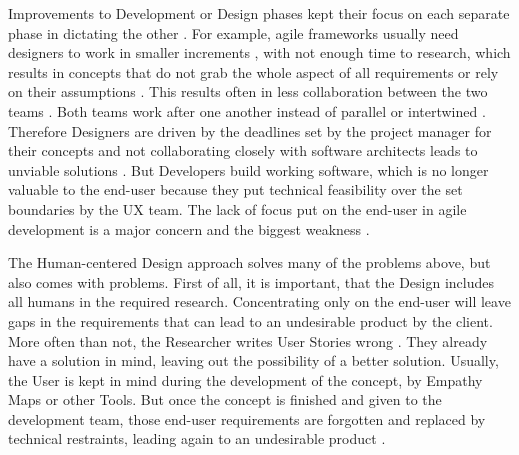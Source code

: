 Improvements to Development or Design phases kept their focus on each separate phase in dictating the other \cite[p. 22]{ratcliffe2011agile}. For example, agile frameworks usually need designers to work in smaller increments \citep{Theartof49:online}, with not enough time to research, which results in concepts that do not grab the whole aspect of all requirements or rely on their assumptions \citep{HowtoCom22:online}. This results often in less collaboration between the two teams \cite[p. iv]{ratcliffe2011agile}\cite[p. 115]{Bringing52:online}. Both teams work after one another instead of parallel or intertwined \cite[p. 9]{Forbrig2015ManagingTA}. Therefore Designers are driven by the deadlines set by the project manager for their concepts and not collaborating closely with software architects leads to unviable solutions \cite[p. 4]{ratcliffe2011agile}. But Developers build working software, which is no longer valuable to the end-user because they put technical feasibility over the set boundaries by the UX team. The lack of focus put on the end-user in agile development is a major concern and the biggest weakness \cite[p. 312]{Humancom0:online}.

The Human-centered Design approach solves many of the problems above, but also comes with problems. First of all, it is important, that the Design includes all humans in the required research. Concentrating only on the end-user will leave gaps in the requirements that can lead to an undesirable product by the client. More often than not, the Researcher writes User Stories wrong \citep{userstor59:online}. They already have a solution in mind, leaving out the possibility of a better solution. Usually, the User is kept in mind during the development of the concept, by Empathy Maps or other Tools. But once the concept is finished and given to the development team, those end-user requirements are forgotten and replaced by technical restraints, leading again to an undesirable product \cite[p. 19, p. 33]{ratcliffe2011agile}.

